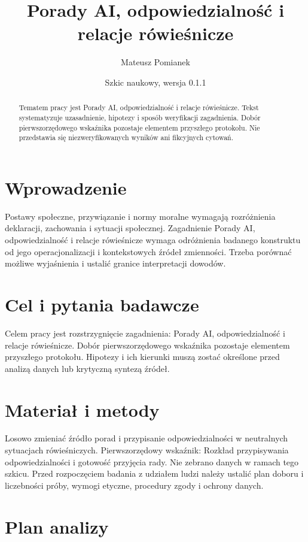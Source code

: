 \documentclass[11pt,a4paper]{article}
\title{Porady AI, odpowiedzialność i relacje rówieśnicze}
\author{Mateusz Pomianek}
\date{Szkic naukowy, wersja 0.1.1}
\begin{document}
\maketitle

\begin{abstract}

Tematem pracy jest Porady AI, odpowiedzialność i relacje rówieśnicze. Tekst systematyzuje uzasadnienie, hipotezy i sposób weryfikacji zagadnienia. Dobór pierwszorzędowego wskaźnika pozostaje elementem przyszłego protokołu. Nie przedstawia się niezweryfikowanych wyników ani fikcyjnych cytowań.

\end{abstract}

\section{Wprowadzenie}

Postawy społeczne, przywiązanie i normy moralne wymagają rozróżnienia deklaracji, zachowania i sytuacji społecznej. Zagadnienie Porady AI, odpowiedzialność i relacje rówieśnicze wymaga odróżnienia badanego konstruktu od jego operacjonalizacji i kontekstowych źródeł zmienności. Trzeba porównać możliwe wyjaśnienia i ustalić granice interpretacji dowodów.

\section{Cel i pytania badawcze}

Celem pracy jest rozstrzygnięcie zagadnienia: Porady AI, odpowiedzialność i relacje rówieśnicze. Dobór pierwszorzędowego wskaźnika pozostaje elementem przyszłego protokołu. Hipotezy i ich kierunki muszą zostać określone przed analizą danych lub krytyczną syntezą źródeł.

\section{Materiał i metody}

Losowo zmieniać źródło porad i przypisanie odpowiedzialności w neutralnych sytuacjach rówieśniczych. Pierwszorzędowy wskaźnik: Rozkład przypisywania odpowiedzialności i gotowość przyjęcia rady. Nie zebrano danych w ramach tego szkicu. Przed rozpoczęciem badania z udziałem ludzi należy ustalić plan doboru i liczebności próby, wymogi etyczne, procedury zgody i ochrony danych.

\section{Plan analizy}
\end{document}
